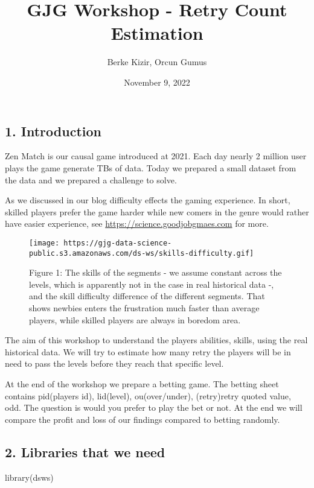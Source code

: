 \documentclass[
]{article}
\title{GJG Workshop - Retry Count Estimation}
\author{Berke Kizir, Orcun Gumus}
\date{November 9, 2022}
\newenvironment{Shaded}{\begin{snugshade}}{\end{snugshade}}
\newcommand{\FunctionTok}[1]{\textcolor[rgb]{0.00,0.00,0.00}{#1}}
\newcommand{\NormalTok}[1]{#1}
\begin{document}
\maketitle

\hypertarget{introduction}{%
\subsection{1. Introduction}\label{introduction}}

Zen Match is our causal game introduced at 2021. Each day nearly 2
million user plays the game generate TBs of data. Today we prepared a
small dataset from the data and we prepared a challenge to solve.

As we discussed in our blog difficulty effects the gaming experience. In
short, skilled players prefer the game harder while new comers in the
genre would rather have easier experience, see
\url{https://science.goodjobgmaes.com} for more.

\begin{figure}
\centering
\texttt{[image: https://gjg-data-science-public.s3.amazonaws.com/ds-ws/skills-difficulty.gif]}
\caption{Figure 1: The skills of the segments - we assume constant
across the levels, which is apparently not in the case in real
historical data -, and the skill difficulty difference of the different
segments. That shows newbies enters the frustration much faster than
average players, while skilled players are always in boredom area.}
\end{figure}

The aim of this workshop to understand the players abilities, skills,
using the real historical data. We will try to estimate how many retry
the players will be in need to pass the levels before they reach that
specific level.

At the end of the workshop we prepare a betting game. The betting sheet
contains pid(players id), lid(level), ou(over/under), (retry)retry
quoted value, odd. The question is would you prefer to play the bet or
not. At the end we will compare the profit and loss of our findings
compared to betting randomly.

\hypertarget{libraries-that-we-need}{%
\subsection{2. Libraries that we need}\label{libraries-that-we-need}}

\begin{Shaded}
\begin{Highlighting}[]
\FunctionTok{library}\NormalTok{(dsws)}
\end{Highlighting}
\end{Shaded}
\end{document}
